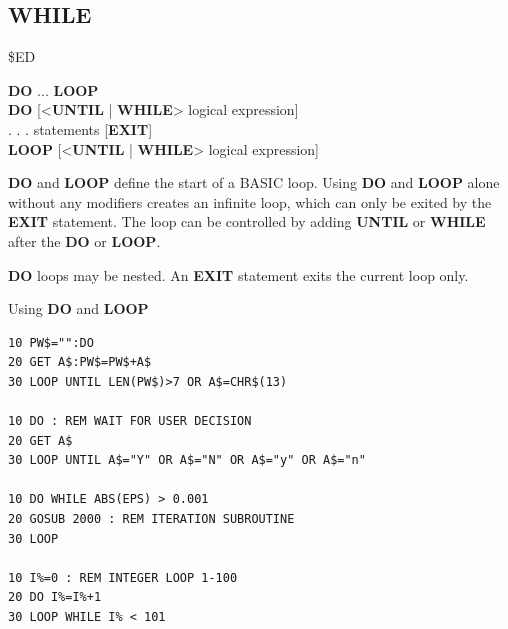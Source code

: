 \subsection{WHILE}
\begin{description}[leftmargin=2cm,style=nextline]
\item [Token:] \$ED
\item [Format:] {\bf DO} ... {\bf LOOP} \\
                {\bf DO} [<{\bf UNTIL} | {\bf WHILE}> logical expression] \\
                . . . statements [{\bf EXIT}] \\
                {\bf LOOP} [<{\bf UNTIL} | {\bf WHILE}> logical expression]
\item [Usage:] {\bf DO} and {\bf LOOP} define
                the start of a BASIC loop.
                Using {\bf DO} and {\bf LOOP} alone without any
                modifiers creates an infinite loop, which can only be exited
                by the {\bf EXIT} statement. The loop can be
                controlled by adding {\bf UNTIL} or {\bf WHILE}
                after the {\bf DO} or {\bf LOOP}.

\item [Remarks:] {\bf DO} loops may be nested. An {\bf EXIT} statement
               exits the current loop only.
\item [Examples:] Using {\bf DO} and {\bf LOOP}
\begin{tcolorbox}[colback=black,coltext=white]
\verbatimfont{\codefont}
\begin{verbatim}
10 PW$="":DO
20 GET A$:PW$=PW$+A$
30 LOOP UNTIL LEN(PW$)>7 OR A$=CHR$(13)

10 DO : REM WAIT FOR USER DECISION
20 GET A$
30 LOOP UNTIL A$="Y" OR A$="N" OR A$="y" OR A$="n"

10 DO WHILE ABS(EPS) > 0.001
20 GOSUB 2000 : REM ITERATION SUBROUTINE
30 LOOP

10 I%=0 : REM INTEGER LOOP 1-100
20 DO I%=I%+1
30 LOOP WHILE I% < 101
\end{verbatim}
\end{tcolorbox}
\end{description}


\newpage
